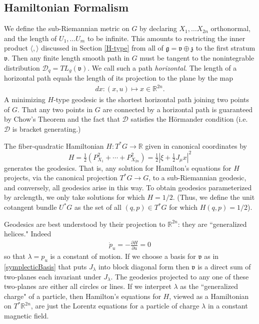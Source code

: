 \documentclass[11pt]{amsart}
\theoremstyle{plain}
\theoremstyle{definition}
\theoremstyle{remark}
\numberwithin{equation}{section}
\def\fz{\mathfrak{z}}
\def\fg{\mathfrak{g}}
\def\fv{\mathfrak{v}}
\def\cD{\mathcal{D}}
\def\R{{\mathbb R}}%
\numberwithin{equation}{section}
\begin{document}
\subsection{Hamiltonian Formalism}\label{HamFormalism}
We define the sub-Riemannian metric on $G$ by declaring $X_1, \ldots X_{2n}$ orthonormal, and the length of  $U_1, \ldots U_m$ to be infinite. This amounts to restricting the inner product $\langle , \rangle$ discussed in Section \ref{H-type} from all of   $\fg=\fv\oplus \fz$  to the first stratum $\fv$. Then any finite length smooth path in $G$ must be tangent to the nonintegrable distribution $\cD_q=TL_g(\fv)$. We call such a path \textit{horizontal}. The length of a horizontal path equals the length of its projection to the plane by the map
\begin{align*}
	dx: (x, u)\mapsto x\in \R^{2n}.
\end{align*}
A minimizing $H$-type geodesic is the shortest horizontal path joining two points of $G$. That any two points in $G$ are connected by a horizontal path is guaranteed by Chow's Theorem and the fact that $\cD$ satisfies the H\"{o}rmander condition (i.e. $\cD$ is bracket generating.)


 
The fiber-quadratic Hamiltonian $H: T^*G\to \R$ given in canonical coordinates by $$H=\tfrac{1}{2}\left(P_{X_{1}}^2+\cdots+P_{X_{2n}}^2\right)=\tfrac{1}{2}|\xi+\tfrac{1}{2}J_\mu x|^2$$
generates the geodesics. That is, any solution for Hamilton's equations for $H$ projects, via the canonical projection $T^*G\to G$, to a sub-Riemannian geodesic, and conversely, all geodesics arise in this way. To obtain geodesics parameterized by arclength, we only take solutions for which $H=1/2$. (Thus, we define the unit cotangent bundle $U^*G$ as the set of all $(q, p)\in T^*G$ for which $H(q, p)=1/2$).  

Geodesics are best understood by their projection to $\R^{2n}$: they are ``generalized helices." 
Indeed 
\begin{align*}
	\dot{p}_u=-\frac{\partial H}{\partial u}=0
\end{align*}
so that $\lambda=p_u$ is a constant of motion. 
 If we choose a basis for $\fv$ as in \eqref{symplecticBasis} that puts $J_\lambda$ into block diagonal form then $\fv$ is a direct sum of two-planes each invariant under $J_\lambda$. The geodesics projected to any one of these two-planes are either all  circles or lines.  
 If we interpret $\lambda$ as the ``generalized charge" of a particle, then Hamilton's equations for $H$, viewed as a Hamiltonian on $T^*\R^{2n}$, are just the Lorentz equations for a particle of charge $\lambda$ in a constant magnetic field. 
\end{document}
